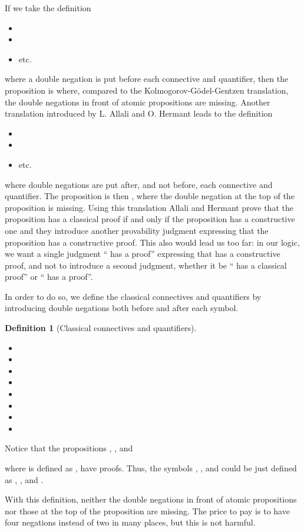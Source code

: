 \documentclass{article}
\newtheorem{definition}{Definition}
\begin{document}
If we take the definition 
\begin{itemize}
\item 
\item 
\item etc.
\end{itemize}
where a double negation is put before each connective and
quantifier, then the proposition  is  where, compared to 
the Kolmogorov-G\"odel-Gentzen translation, 
the double
negations in front of atomic propositions are missing.  
Another translation introduced by L. Allali and O. Hermant \cite{AH}
leads to the definition 
\begin{itemize}
\item 
\item 
\item etc.
\end{itemize}
where double negations are put after, and not before, each connective and
quantifier.
The proposition  is then ,
where the double negation at the top of the proposition is missing.
Using this translation Allali and Hermant prove that the proposition
 has a classical proof if and only if the proposition  has a constructive one and they introduce another provability
judgment expressing that the proposition  has a
constructive proof. This also would lead us too far: in our logic, 
we want a single
judgment `` has a proof'' expressing that  has a constructive
proof, and not to introduce a second judgment, whether it be `` has
a classical proof'' or `` has a proof''.

In order to do so, we define the classical connectives and quantifiers by
introducing double negations both before and after each symbol.
\begin{definition}[Classical connectives and quantifiers]~
\begin{itemize}
\item 
\item 
\item 
\item 
\item 
\item 
\item 
\item 
\end{itemize}
\end{definition}
Notice that the propositions 
, 
, and

where  is defined as 
, 
have proofs. Thus, the symbols , , and  could be just 
defined as , , and .

With this definition, neither the double negations in front of atomic
propositions nor those at the top of the proposition are missing. The
price to pay is to have four negations instead of two in many places,
but this is not harmful.
\end{document}
